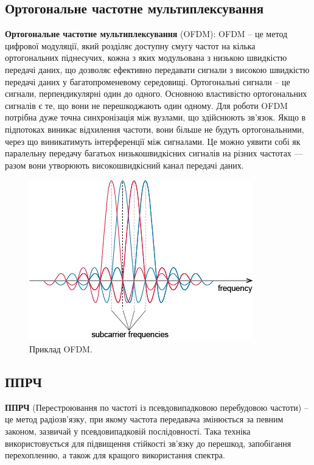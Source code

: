\documentclass{article}
\begin{document}
\subsection{Ортогональне частотне мультиплексування}
\textbf{Ортогональне частотне мультиплексування} (OFDM): OFDM – це метод цифрової модуляції, який розділяє доступну смугу частот на кілька ортогональних піднесучих, кожна з яких модульована з низькою швидкістю передачі даних, що дозволяє ефективно передавати сигнали з високою швидкістю передачі даних у багатопроменевому середовищі.
Ортогональні сигнали – це сигнали, перпендикулярні один до одного. Основною властивістю ортогональних сигналів є те, що вони не перешкоджають один одному. Для роботи OFDM потрібна дуже точна синхронізація між вузлами, що здійснюють зв'язок. Якщо в підпотоках виникає відхилення частоти, вони більше не будуть ортогональними, через що виникатимуть інтерференції між сигналами. Це можно уявити собі як паралельну передачу багатьох низькошвидкісних сигналів на різних частотах — разом вони утворюють високошвидкісний канал передачі даних.

\begin{figure}[h!]
	\centering
	\includegraphics[width=0.7\linewidth]{images/ofdm.png}
	\caption{\label{fig:ofdm}  Приклад OFDM.}
\end{figure}


\subsection{ППРЧ}

\textbf{ППРЧ} (Перестроювання по частоті із псевдовипадковою перебудовою частоти) -- це метод радіозв'язку, при якому частота передавача змінюється за певним законом, зазвичай у псевдовипадковій послідовності. Така техніка використовується для підвищення стійкості зв'язку до перешкод, запобігання перехопленню, а також для кращого використання спектра.
\end{document}
